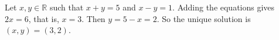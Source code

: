 Let $x, y \in \mathbb{R}$ such that $x + y = 5$ and $x - y = 1$.
Adding the equations gives $2x = 6$, that is, $x = 3$.
Then $y = 5 - x = 2$.
So the unique solution is $(x, y) = (3, 2)$.